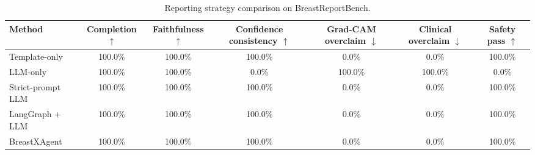 \begin{table}[t]
\centering
\caption{Reporting strategy comparison on BreastReportBench.}
\label{tab:reporting-strategy-comparison}
\begin{tabular}{lcccccc}
\toprule
Method & Completion $\uparrow$ & Faithfulness $\uparrow$ & Confidence consistency $\uparrow$ & Grad-CAM overclaim $\downarrow$ & Clinical overclaim $\downarrow$ & Safety pass $\uparrow$ \\
\midrule
Template-only & 100.0\% & 100.0\% & 100.0\% & 0.0\% & 0.0\% & 100.0\% \\
LLM-only & 100.0\% & 100.0\% & 0.0\% & 100.0\% & 100.0\% & 0.0\% \\
Strict-prompt LLM & 100.0\% & 100.0\% & 100.0\% & 0.0\% & 0.0\% & 100.0\% \\
LangGraph + LLM & 100.0\% & 100.0\% & 100.0\% & 0.0\% & 0.0\% & 100.0\% \\
BreastXAgent & 100.0\% & 100.0\% & 100.0\% & 0.0\% & 0.0\% & 100.0\% \\
\bottomrule
\end{tabular}
\end{table}
